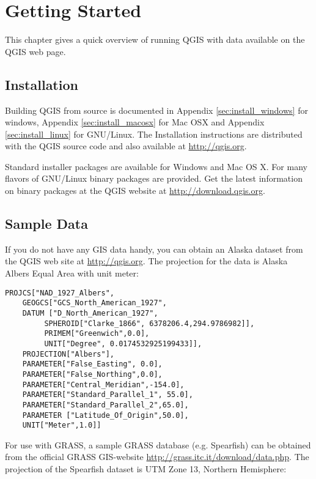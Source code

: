 \section{Getting Started}\label{label_getstarted}

This chapter gives a quick overview of running QGIS with data available on the QGIS web page.

\subsection{Installation}\label{label_installation}

Building QGIS from source is documented in Appendix \ref{sec:install_windows} for windows, 
Appendix \ref{sec:install_macosx} for Mac OSX and Appendix \ref{sec:install_linux} for GNU/Linux. 
The Installation instructions are distributed with the QGIS source code and also available 
at \url{http://qgis.org}. 

Standard installer packages are available for Windows and Mac OS X. For many 
flavors of GNU/Linux binary packages are provided. Get the latest information 
on binary packages at the QGIS website at \url{http://download.qgis.org}.

\subsection{Sample Data}\label{label_sampledata}

If you do not have any GIS data handy, you can obtain an Alaska
dataset from the QGIS web site at \url{http://qgis.org}. The projection 
for the data is Alaska Albers Equal Area with unit meter:

\begin{verbatim}
PROJCS["NAD_1927_Albers",
    GEOGCS["GCS_North_American_1927",
	DATUM ["D_North_American_1927",
	     SPHEROID["Clarke_1866", 6378206.4,294.9786982]],
	     PRIMEM["Greenwich",0.0],
	     UNIT["Degree", 0.0174532925199433]],
    PROJECTION["Albers"],
    PARAMETER["False_Easting", 0.0],
    PARAMETER["False_Northing",0.0],
    PARAMETER["Central_Meridian",-154.0],
    PARAMETER["Standard_Parallel_1", 55.0],
    PARAMETER["Standard_Parallel_2",65.0],
    PARAMETER ["Latitude_Of_Origin",50.0],
    UNIT["Meter",1.0]]
\end{verbatim}

For use with GRASS, a sample GRASS database (e.g. Spearfish) can be obtained 
from the official GRASS GIS-website \url{http://grass.itc.it/download/data.php}. 
The projection of the Spearfish dataset is UTM Zone 13, Northern Hemisphere: 

